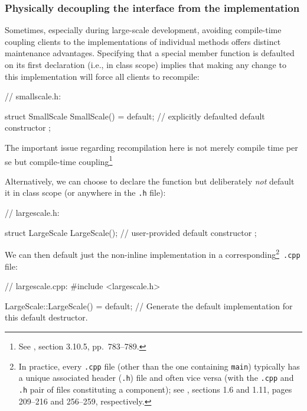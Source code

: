 \subsubsection[Physically decoupling the interface from the implementation]{Physically decoupling the interface from the implementation}\label{physically-decoupling-the-interface-from-the-implementation}

Sometimes, especially during large-scale development, avoiding compile-time coupling clients to the
implementations of individual methods offers distinct maintenance advantages. Specifying that a special member
function is defaulted on its first declaration (i.e., in class scope)
implies that making any change to this implementation will force all
clients to recompile:

\begin{emcppslisting}
// smallscale.h:

struct SmallScale
{
    SmallScale() = default;  // explicitly defaulted default constructor
};
\end{emcppslisting}

\noindent The important issue regarding recompilation here is not merely compile time per se but compile-time coupling{\cprotect\footnote{See
  \cite{lakos20}, section 3.10.5, pp.~783--789.}}

Alternatively, we can choose to declare the function but deliberately
\emph{not} default it in class scope (or anywhere in the \lstinline!.h!
file):

\begin{emcppslisting}[emcppsbatch=e4]
// largescale.h:

struct LargeScale
{
    LargeScale();  // user-provided default constructor
};
\end{emcppslisting}

\noindent We can then default just the non-inline implementation in a
corresponding{\cprotect\footnote{In practice, every \lstinline!.cpp! file
(other than the one containing \lstinline!main!) typically has a unique
associated header (\lstinline!.h!) file and often vice versa  (with the \lstinline!.cpp! and \lstinline!.h! pair of files constituting a component); see \cite{lakos20}, sections 1.6 and 1.11,
  pages 209--216 and 256--259, respectively.}}~\lstinline!.cpp! file:

\begin{emcppslisting}[emcppsbatch=e4]
// largescale.cpp:
#include <largescale.h>

LargeScale::LargeScale() = default;
    // Generate the default implementation for this default destructor.
\end{emcppslisting}

